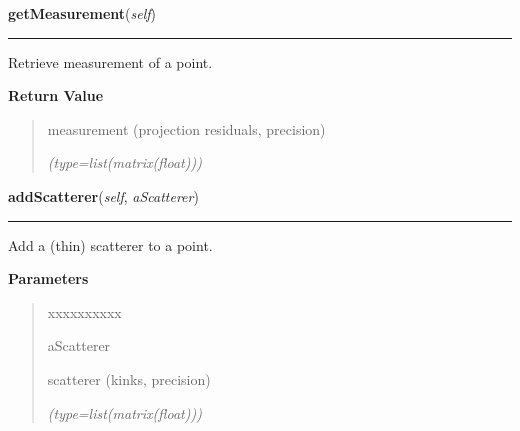     \label{gblfit:GblPoint:getMeasurement}

    \vspace{0.5ex}

\hspace{.8\funcindent}\begin{boxedminipage}{\funcwidth}

    \raggedright \textbf{getMeasurement}(\textit{self})

    \vspace{-1.5ex}

    \rule{\textwidth}{0.5\fboxrule}
\setlength{\parskip}{2ex}
    Retrieve measurement of a point.

\setlength{\parskip}{1ex}
      \textbf{Return Value}
    \vspace{-1ex}

      \begin{quote}
      measurement (projection residuals, precision)

      {\it (type=list(matrix(float)))}

      \end{quote}

    \end{boxedminipage}

    \label{gblfit:GblPoint:addScatterer}

    \vspace{0.5ex}

\hspace{.8\funcindent}\begin{boxedminipage}{\funcwidth}

    \raggedright \textbf{addScatterer}(\textit{self}, \textit{aScatterer})

    \vspace{-1.5ex}

    \rule{\textwidth}{0.5\fboxrule}
\setlength{\parskip}{2ex}
    Add a (thin) scatterer to a point.

\setlength{\parskip}{1ex}
      \textbf{Parameters}
      \vspace{-1ex}

      \begin{quote}
        \begin{Ventry}{xxxxxxxxxx}

          \item[aScatterer]

          scatterer (kinks, precision)

            {\it (type=list(matrix(float)))}

        \end{Ventry}

      \end{quote}

    \end{boxedminipage}

